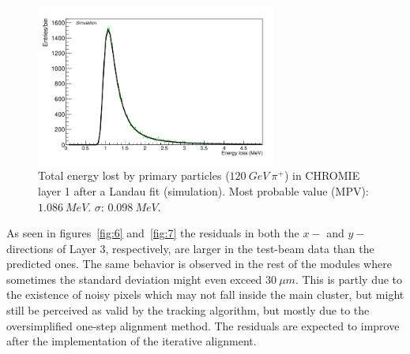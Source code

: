 \documentclass[a4paper,11pt]{article}
\begin{document}
\begin{figure}[htbp]
	\centering %
	\includegraphics[width=0.7\textwidth,origin=c,angle=0]{Landau_fit.png}
	\caption{\label{fig:5} Total energy lost by primary particles ($120\: GeV\: \pi^{+}$) in CHROMIE layer 1 after a Landau fit (simulation). Most probable value (MPV): $1.086\: MeV$. $\sigma$: $0.098\: MeV$.}
\end{figure}

As seen in figures~\ref{fig:6} and~\ref{fig:7} the residuals in both the $x-$ and $y-$ directions of Layer 3, respectively, are larger in the test-beam data than the predicted ones. The same behavior is observed in the rest of the modules where sometimes the standard deviation might even exceed $30\: \mu m$. This is partly due to the existence of noisy pixels which may not fall inside the main cluster, but might still be perceived as valid by the tracking algorithm, but mostly due to the oversimplified one-step alignment method. The residuals are expected to improve after the implementation of the iterative alignment.
\end{document}
